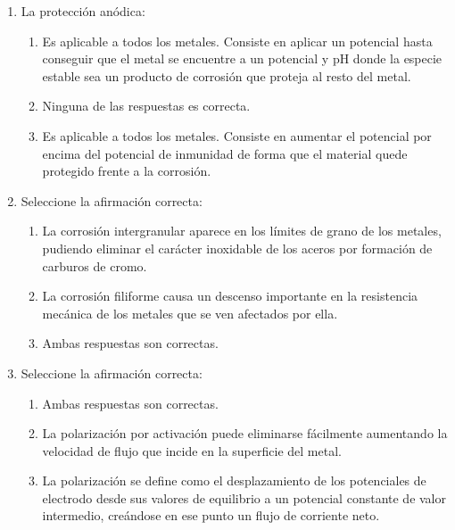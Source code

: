 \begin{enumerate}
    \item La protección anódica:
          \begin{enumerate}[label=\alph*.]
              \item Es aplicable a todos los metales. Consiste en aplicar un potencial hasta conseguir que el metal se encuentre a un potencial y pH donde la especie estable sea un producto de corrosión que proteja al resto del metal.
              \item \textcolor{red!85!black}{Ninguna de las respuestas es correcta.}
              \item Es aplicable a todos los metales. Consiste en aumentar el potencial por encima del potencial de inmunidad de forma que el material quede protegido frente a la corrosión.
          \end{enumerate}

    \item Seleccione la afirmación correcta:
          \begin{enumerate}[label=\alph*.]
              \item \textcolor{red!85!black}{La corrosión intergranular aparece en los límites de grano de los metales, pudiendo eliminar el carácter inoxidable de los aceros por formación de carburos de cromo.}
              \item La corrosión filiforme causa un descenso importante en la resistencia mecánica de los metales que se ven afectados por ella.
              \item Ambas respuestas son correctas.
          \end{enumerate}

    \item Seleccione la afirmación correcta:
          \begin{enumerate}[label=\alph*.]
              \item Ambas respuestas son correctas.
              \item La polarización por activación puede eliminarse fácilmente aumentando la velocidad de flujo que incide en la superficie del metal.
              \item \textcolor{red!85!black}{La polarización se define como el desplazamiento de los potenciales de electrodo desde sus valores de equilibrio a un potencial constante de valor intermedio, creándose en ese punto un flujo de corriente neto.}
          \end{enumerate}


\end{enumerate}
